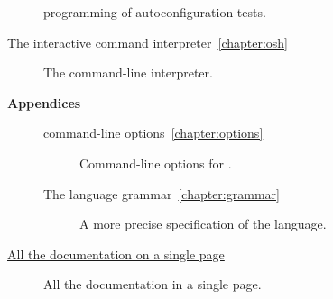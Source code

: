 \begin{description}
   programming of autoconfiguration tests.
\item[The interactive command interpreter~\ref{chapter:osh}]
%
   The  command-line interpreter.
\item[\textbf{Appendices}]
\begin{description}
\item[\OMake{} command-line options~\ref{chapter:options}]
%
   Command-line options for .
%
\item[The \OMake{} language grammar~\ref{chapter:grammar}]
%
   A more precise specification of the \OMake{} language.
\end{description}
\item[\href{omake-doc.html}{All the documentation on a single page}]
%
   All the \OMake{} documentation in a single page.
\end{description}

